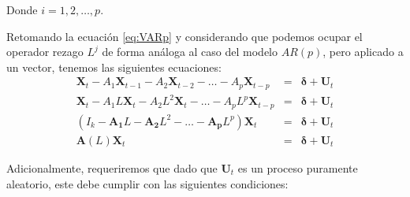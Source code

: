 \documentclass[
]{book}
\begin{document}
Donde \(i = 1, 2, \ldots, p\).

Retomando la ecuación \eqref{eq:VARp} y considerando que podemos ocupar
el operador rezago \(L^j\) de forma análoga al caso del modelo \(AR(p)\),
pero aplicado a un vector, tenemos las siguientes ecuaciones:
\begin{eqnarray}
    \mathbf{X}_t - A_1 \mathbf{X}_{t-1} - A_2 \mathbf{X}_{t-2} - \ldots - A_p \mathbf{X}_{t-p} & = & \boldsymbol{\delta} + \mathbf{U}_{t} \nonumber \\
    \mathbf{X}_t - A_1 L \mathbf{X}_{t} - A_2 L^2 \mathbf{X}_{t} - \ldots - A_p L^p \mathbf{X}_{t-p} & = & \boldsymbol{\delta} + \mathbf{U}_{t} \nonumber \\
    (I_k - \mathbf{A_1} L - \mathbf{A_2} L^2 - \ldots - \mathbf{A_p} L^p) \mathbf{X}_t & = & \boldsymbol{\delta} + \mathbf{U}_{t} \nonumber \\
    \mathbf{A}(L) \mathbf{X}_t & = & \boldsymbol{\delta} + \mathbf{U}_{t}
    \label{eq:VARCorto}
\end{eqnarray}

Adicionalmente, requeriremos que dado que \(\mathbf{U}_t\) es un proceso
puramente aleatorio, este debe cumplir con las siguientes condiciones:
\end{document}
